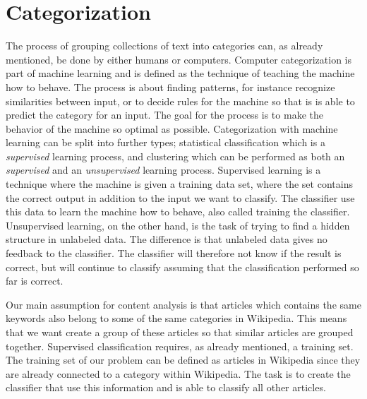 \documentclass[english,a4paper]{ifimaster}
\begin{document}
\chapter{Categorization}
The process of grouping collections of text into categories can, as already mentioned, be done by either humans or computers. Computer categorization is part of machine learning and is defined as the technique of teaching the machine how to behave. The process is about finding patterns, for instance recognize similarities between input, or to decide rules for the machine so that is is able to predict the category for an input. The goal for the process is to make the behavior of the machine so optimal as possible. Categorization with machine learning can be split into further types; statistical classification which is a \textit{supervised} learning process, and clustering which can be performed as both an \textit{supervised} and an \textit{unsupervised} learning process. Supervised learning is a technique where the machine is given a training data set, where the set contains the correct output in addition to the input we want to classify. The classifier use this data to learn the machine how to behave, also called training the classifier. Unsupervised learning, on the other hand, is the task of trying to find a hidden structure in unlabeled data. The difference is that unlabeled data gives no feedback to the classifier. 
The classifier will therefore not know if the result is correct, but will continue to classify assuming that the classification performed so far is correct.  

Our main assumption for content analysis is that articles which contains the same keywords also belong to some of the same categories in Wikipedia. This means that we want create a group of these articles so that similar articles are grouped together. Supervised classification requires, as already mentioned, a training set. The training set of our problem can be defined as articles in Wikipedia since they are already connected to a category within Wikipedia. The task is to create the classifier that use  this information and is able to classify all other articles. 

\end{document}

